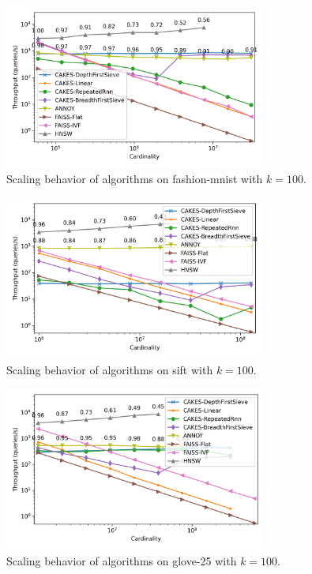 \documentclass[review,supplement,onefignum,onetabnum]{siamonline220329}
\begin{document}
\begin{figure}[ht!]
    \centering
    \includegraphics[width=3.4in]{plots/fashion-mnist-knn-100.png}
    \caption{
        Scaling behavior of algorithms on fashion-mnist with $k=100$. 
    }
    \label{fig:supplement:fashion-mnist-k-100}
\end{figure}

\begin{figure}[ht!]
    \centering
    \includegraphics[width=3.4in]{plots/sift-knn-100.png}
    \caption{
        Scaling behavior of algorithms on sift with $k=100$. 
    }
    \label{fig:supplement:sift-k-100}
\end{figure}

\begin{figure}[ht!]
    \centering
    \includegraphics[width=3.4in]{plots/glove-25-knn-100.png}
    \caption{
        Scaling behavior of algorithms on glove-25 with $k=100$. 
    }
    \label{fig:supplement:glove-25-k-100}
\end{figure}
\end{document}
